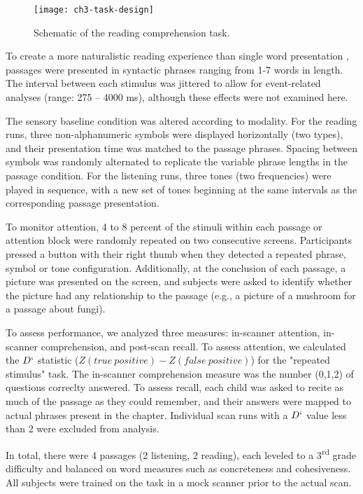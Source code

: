 \begin{figure}[t]
	\centering
	\texttt{[image: ch3-task-design]}
	\caption[Schematic of the reading comprehension task.]{Schematic of the reading comprehension task. }
	\label{fig:ch3-task-design}
\end{figure}

To create a more naturalistic reading experience than single word presentation \citep{Rayner1998}, passages were presented in syntactic phrases ranging from 1-7 words in length. The interval between each stimulus was jittered to allow for event-related analyses (range: 275 – 4000 ms), although these effects were not examined here.

The sensory baseline condition was altered according to modality. For the reading runs, three non-alphanumeric symbols were displayed horizontally (two types), and their presentation time was matched to the passage phrases. Spacing between symbols was randomly alternated to replicate the variable phrase lengths in the passage condition. For the listening runs, three tones (two frequencies) were played in sequence, with a new set of tones beginning at the same intervals as the corresponding passage presentation. 

To monitor attention, 4 to 8 percent of the stimuli within each passage or attention block were randomly repeated on two consecutive screens.  Participants pressed a button with their right thumb when they detected a repeated phrase, symbol or tone configuration. Additionally, at the conclusion of each passage, a picture was presented on the screen, and subjects were asked to identify whether the picture had any relationship to the passage (e.g., a picture of a mushroom for a passage about fungi). 

To assess performance, we analyzed three measures: in-scanner attention, in-scanner comprehension, and post-scan recall. To assess attention, we calculated the $D`$ statistic ($Z(true\ positive) - Z(false\ positive)$) for the "repeated stimulus" task. The in-scanner comprehension measure was the number (0,1,2) of questions correclty answered. To assess recall, each child was asked to recite as much of the passage as they could remember, and their answers were mapped to actual phrases present in the chapter. Individual scan runs with a $D`$ value less than 2 were excluded from analysis.

In total, there were 4 passages (2 listening, 2 reading), each leveled to a 3\textsuperscript{rd} grade difficulty and balanced on word measures such as concreteness and cohesiveness.  All subjects were trained on the task in a mock scanner prior to the actual scan. 


